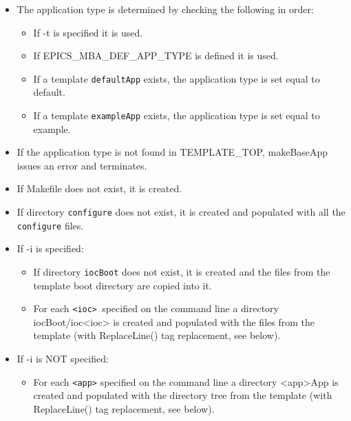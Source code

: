 \begin{itemize}
\item The application type is determined by checking the following in order:

\begin{itemize}

\item If -t is specified it is used.

\item If EPICS\_MBA\_DEF\_APP\_TYPE is defined it is used.

\item If a template \verb|defaultApp| exists, the application type is set equal to default.

\item If a template \verb|exampleApp| exists, the application type is set equal to example.

\end{itemize}

\item If the application type is not found in TEMPLATE\_TOP, makeBaseApp issues an error and terminates.

\item If Makefile does not exist, it is created.

\item If directory \verb|configure| does not exist, it is created and populated with all the \verb|configure| files.

\item If -i is specified:

\begin{itemize}

\item If directory \verb|iocBoot| does not exist, it is created and the files from the template boot directory are copied 
into it.

\item For each \verb|<ioc> |specified on the command line a directory iocBoot/ioc\textless{}ioc\textgreater{} is created and populated with 
the files from the template (with ReplaceLine() tag replacement, see below).

\end{itemize}

\item If -i is NOT specified:

\begin{itemize}

\item For each \verb|<app>| specified on the command line a directory \textless{}app\textgreater{}App is created and populated with the 
directory tree from the template (with ReplaceLine() tag replacement, see below).
\end{itemize}
\end{itemize}

